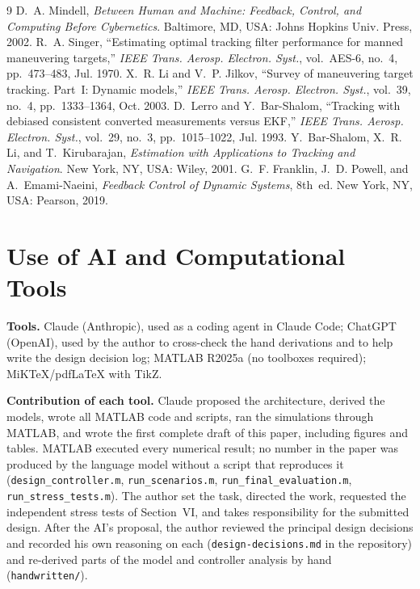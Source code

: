 \documentclass[conference]{IEEEtran}
\begin{document}
\begin{thebibliography}{9}
 D.~A. Mindell, \emph{Between Human and Machine: Feedback, Control, and Computing Before Cybernetics}. Baltimore, MD, USA: Johns Hopkins Univ. Press, 2002.
 R.~A. Singer, ``Estimating optimal tracking filter performance for manned maneuvering targets,'' \emph{IEEE Trans. Aerosp. Electron. Syst.}, vol.~AES-6, no.~4, pp.~473--483, Jul. 1970.
 X.~R. Li and V.~P. Jilkov, ``Survey of maneuvering target tracking. Part~I: Dynamic models,'' \emph{IEEE Trans. Aerosp. Electron. Syst.}, vol.~39, no.~4, pp.~1333--1364, Oct. 2003.
 D.~Lerro and Y.~Bar-Shalom, ``Tracking with debiased consistent converted measurements versus EKF,'' \emph{IEEE Trans. Aerosp. Electron. Syst.}, vol.~29, no.~3, pp.~1015--1022, Jul. 1993.
 Y.~Bar-Shalom, X.~R. Li, and T.~Kirubarajan, \emph{Estimation with Applications to Tracking and Navigation}. New York, NY, USA: Wiley, 2001.
 G.~F. Franklin, J.~D. Powell, and A.~Emami-Naeini, \emph{Feedback Control of Dynamic Systems}, 8th~ed. New York, NY, USA: Pearson, 2019.
\end{thebibliography}

\clearpage
\appendices
\section{Use of AI and Computational Tools}
\textbf{Tools.} Claude (Anthropic), used as a coding agent in Claude Code; ChatGPT (OpenAI), used by the author to cross-check the hand derivations and to help write the design decision log; MATLAB R2025a (no toolboxes required); MiKTeX/pdfLaTeX with TikZ.

\textbf{Contribution of each tool.} Claude proposed the architecture, derived the models, wrote all MATLAB code and scripts, ran the simulations through MATLAB, and wrote the first complete draft of this paper, including figures and tables. MATLAB executed every numerical result; no number in the paper was produced by the language model without a script that reproduces it (\texttt{design\_controller.m}, \texttt{run\_scenarios.m}, \texttt{run\_final\_evaluation.m}, \texttt{run\_stress\_tests.m}). The author set the task, directed the work, requested the independent stress tests of Section~VI, and takes responsibility for the submitted design. After the AI's proposal, the author reviewed the principal design decisions and recorded his own reasoning on each (\texttt{design-decisions.md} in the repository) and re-derived parts of the model and controller analysis by hand (\texttt{handwritten/}).
\end{document}
